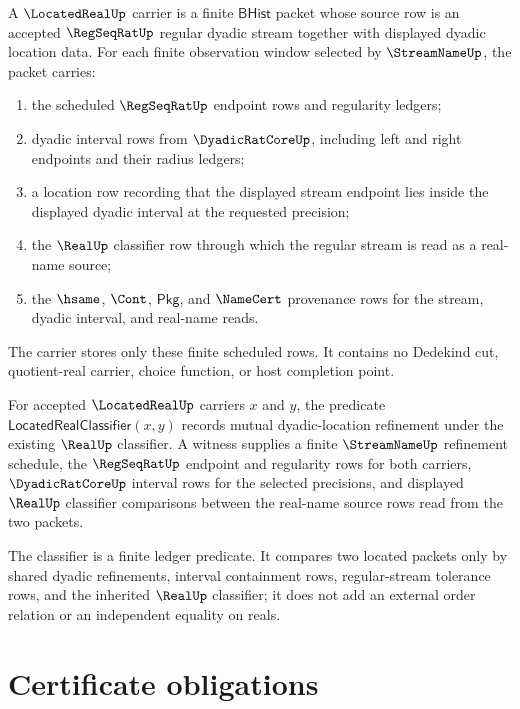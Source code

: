 \begin{definition}
\label{def:locatedreal-carrier}
A $\LocatedRealUp$ carrier is a finite $\mathsf{BHist}$ packet whose source row is an accepted $\RegSeqRatUp$ regular dyadic stream together with displayed dyadic location data. For each finite observation window selected by $\StreamNameUp$, the packet carries:
\begin{enumerate}
\item the scheduled $\RegSeqRatUp$ endpoint rows and regularity ledgers;
\item dyadic interval rows from $\DyadicRatCoreUp$, including left and right endpoints and their radius ledgers;
\item a location row recording that the displayed stream endpoint lies inside the displayed dyadic interval at the requested precision;
\item the $\RealUp$ classifier row through which the regular stream is read as a real-name source;
\item the $\hsame$, $\Cont$, $\mathsf{Pkg}$, and $\NameCert$ provenance rows for the stream, dyadic interval, and real-name reads.
\end{enumerate}
The carrier stores only these finite scheduled rows. It contains no Dedekind cut, quotient-real carrier, choice function, or host completion point.
\end{definition}

\begin{definition}
\label{def:locatedreal-classifier}
For accepted $\LocatedRealUp$ carriers $x$ and $y$, the predicate $\mathsf{LocatedRealClassifier}(x,y)$ records mutual dyadic-location refinement under the existing $\RealUp$ classifier. A witness supplies a finite $\StreamNameUp$ refinement schedule, the $\RegSeqRatUp$ endpoint and regularity rows for both carriers, $\DyadicRatCoreUp$ interval rows for the selected precisions, and displayed $\RealUp$ classifier comparisons between the real-name source rows read from the two packets.

The classifier is a finite ledger predicate. It compares two located packets only by shared dyadic refinements, interval containment rows, regular-stream tolerance rows, and the inherited $\RealUp$ classifier; it does not add an external order relation or an independent equality on reals.
\end{definition}

\section{Certificate obligations}
\label{sec:locatedreal-certificate-obligations}

